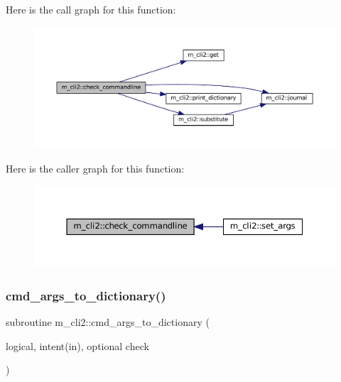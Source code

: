 Here is the call graph for this function\+:\nopagebreak
\begin{figure}[H]
\begin{center}
\leavevmode
\includegraphics[width=350pt]{namespacem__cli2_ada8b5e7a86778085f55821ec31c5977a_cgraph}
\end{center}
\end{figure}
Here is the caller graph for this function\+:\nopagebreak
\begin{figure}[H]
\begin{center}
\leavevmode
\includegraphics[width=350pt]{namespacem__cli2_ada8b5e7a86778085f55821ec31c5977a_icgraph}
\end{center}
\end{figure}
\mbox{\label{namespacem__cli2_a3348b0c76dadd62c536e06f82bcb0331}} 
\subsubsection{\texorpdfstring{cmd\+\_\+args\+\_\+to\+\_\+dictionary()}{cmd\_args\_to\_dictionary()}}
{\footnotesize\ttfamily subroutine m\+\_\+cli2\+::cmd\+\_\+args\+\_\+to\+\_\+dictionary (\begin{DoxyParamCaption}\item[{logical, intent(in), optional}]{check }\end{DoxyParamCaption})\hspace{0.3cm}{\ttfamily [private]}}




